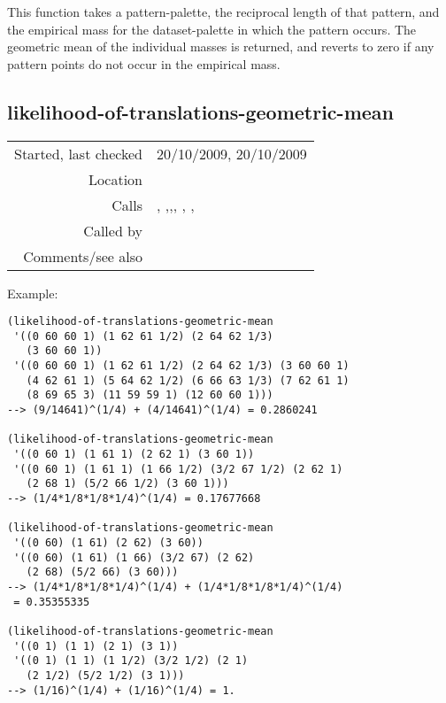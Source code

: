\noindent This function takes a pattern-palette, the
reciprocal length of that pattern, and the empirical
mass for the dataset-palette in which the pattern
occurs. The geometric mean of the individual masses is
returned, and reverts to zero if any pattern points do
not occur in the empirical mass.


\subsection*{likelihood-of-translations-geometric-mean}\label{fun:likelihood-of-translations-geometric-mean}

\vspace{0.3cm}
\begin{tabular}{r|p{8cm}}
Started, last checked & 20/10/2009, 20/10/2009 \\
Location & \nameref{sec:empirical-preliminaries} \\
Calls & \nameref{fun:constant-vector}, \nameref{fun:direct-product-of-n-sets},\newline \nameref{fun:empirical-mass},\newline \nameref{fun:likelihood-of-subset-geometric-mean}, \nameref{fun:orthogonal-projection-not-unique-equalp}, \nameref{fun:potential-n-dim-translations}, \nameref{fun:translation} \\
Called by & \\
Comments/see also &
\end{tabular}

\vspace{0.5cm}
\noindent Example:
\begin{verbatim}
(likelihood-of-translations-geometric-mean
 '((0 60 60 1) (1 62 61 1/2) (2 64 62 1/3)
   (3 60 60 1))
 '((0 60 60 1) (1 62 61 1/2) (2 64 62 1/3) (3 60 60 1)
   (4 62 61 1) (5 64 62 1/2) (6 66 63 1/3) (7 62 61 1)
   (8 69 65 3) (11 59 59 1) (12 60 60 1)))
--> (9/14641)^(1/4) + (4/14641)^(1/4) = 0.2860241

(likelihood-of-translations-geometric-mean
 '((0 60 1) (1 61 1) (2 62 1) (3 60 1))
 '((0 60 1) (1 61 1) (1 66 1/2) (3/2 67 1/2) (2 62 1) 
   (2 68 1) (5/2 66 1/2) (3 60 1)))
--> (1/4*1/8*1/8*1/4)^(1/4) = 0.17677668

(likelihood-of-translations-geometric-mean
 '((0 60) (1 61) (2 62) (3 60))
 '((0 60) (1 61) (1 66) (3/2 67) (2 62) 
   (2 68) (5/2 66) (3 60)))
--> (1/4*1/8*1/8*1/4)^(1/4) + (1/4*1/8*1/8*1/4)^(1/4)
 = 0.35355335

(likelihood-of-translations-geometric-mean
 '((0 1) (1 1) (2 1) (3 1))
 '((0 1) (1 1) (1 1/2) (3/2 1/2) (2 1) 
   (2 1/2) (5/2 1/2) (3 1)))
--> (1/16)^(1/4) + (1/16)^(1/4) = 1.
\end{verbatim}

